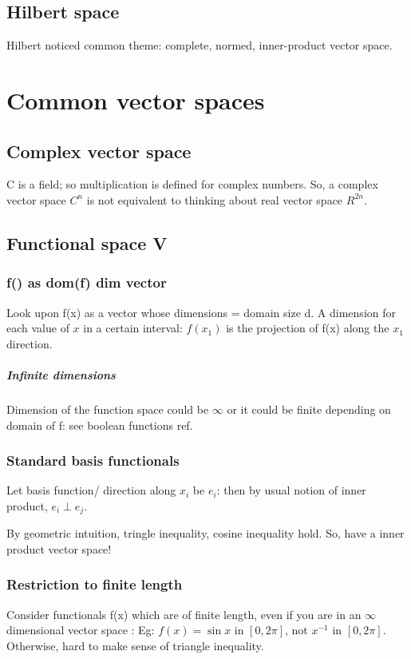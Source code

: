 \documentclass[oneside, article]{memoir}
\begin{document}
\section{Hilbert space}
Hilbert noticed common theme: complete, normed, inner-product vector space.

\chapter{Common vector spaces}
\section{Complex vector space}
C is a field; so multiplication is defined for complex numbers. So, a complex vector space $C^{n}$ is not equivalent to thinking about real vector space $R^{2n}$.

\section{Functional space V}
\subsection{f() as dom(f) dim vector}
Look upon f(x) as a vector whose dimensions = domain size d. A dimension for each value of $x$ in a certain interval: $f(x_{1})$ is the projection of f(x) along the $x_{1}$ direction.

\paragraph*{Infinite dimensions}
Dimension of the function space could be $\infty$ or it could be finite depending on domain of f: see boolean functions ref.

\subsection{Standard basis functionals}
Let basis function/ direction along $x_{i}$ be $e_{i}$: then by usual notion of inner product, $e_{i} \perp e_{j}$.

By geometric intuition, tringle inequality, cosine inequality hold. So, have a inner product vector space!

\subsection{Restriction to finite length}
Consider functionals f(x) which are of finite length, even if you are in an $\infty$ dimensional vector space : Eg: $f(x) = \sin x$ in $[0,2\pi]$, not $x^{-1}$ in $[0,2\pi]$. Otherwise, hard to make sense of triangle inequality.
\end{document}
